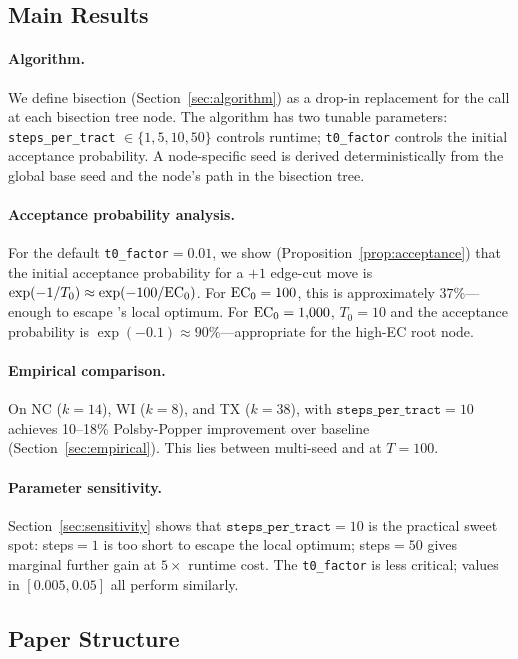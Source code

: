 \subsection{Main Results}

\paragraph{Algorithm.}
We define \sa{} bisection (Section~\ref{sec:algorithm}) as a drop-in
replacement for the \metis{} call at each bisection tree node.
The algorithm has two tunable parameters:
\texttt{steps\_per\_tract} $\in \{1,5,10,50\}$ controls runtime;
\texttt{t0\_factor} controls the initial acceptance probability.
A node-specific seed is derived deterministically from the global base
seed and the node's path in the bisection tree.

\paragraph{Acceptance probability analysis.}
For the default \texttt{t0\_factor}$= 0.01$, we show (Proposition~\ref{prop:acceptance})
that the initial acceptance probability for a $+1$ edge-cut move is
$\exp(-1/T_0) \approx \exp(-100/\mathrm{EC}_0)$.
For $\mathrm{EC}_0 = 100$, this is approximately $37\%$---enough to escape \metis{}'s
local optimum.
For $\mathrm{EC}_0 = 1{,}000$, $T_0 = 10$ and the acceptance probability is
$\exp(-0.1) \approx 90\%$---appropriate for the high-EC root node.

\paragraph{Empirical comparison.}
On NC ($k=14$), WI ($k=8$), and TX ($k=38$), \sa{} with
$\texttt{steps\_per\_tract} = 10$ achieves 10--18\% Polsby-Popper
improvement over baseline \metis{} (Section~\ref{sec:empirical}).
This lies between multi-seed \metis{} and \be{} at $T=100$.

\paragraph{Parameter sensitivity.}
Section~\ref{sec:sensitivity} shows that $\texttt{steps\_per\_tract} = 10$
is the practical sweet spot: steps$= 1$ is too short to escape the local
optimum; steps$= 50$ gives marginal further gain at $5\times$ runtime cost.
The \texttt{t0\_factor} is less critical; values in $[0.005, 0.05]$ all
perform similarly.

\subsection{Paper Structure}

